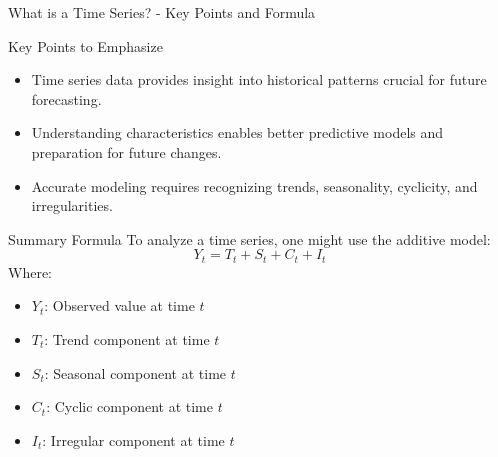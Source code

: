 \documentclass[aspectratio=169]{beamer}
\begin{document}
\begin{frame}[fragile]{What is a Time Series? - Key Points and Formula}
    \begin{block}{Key Points to Emphasize}
        \begin{itemize}
            \item Time series data provides insight into historical patterns crucial for future forecasting.
            \item Understanding characteristics enables better predictive models and preparation for future changes.
            \item Accurate modeling requires recognizing trends, seasonality, cyclicity, and irregularities.
        \end{itemize}
    \end{block}

    \begin{block}{Summary Formula}
        To analyze a time series, one might use the additive model:
        \begin{equation}
            Y_t = T_t + S_t + C_t + I_t 
        \end{equation}
        Where:
        \begin{itemize}
            \item $Y_t$: Observed value at time $t$
            \item $T_t$: Trend component at time $t$
            \item $S_t$: Seasonal component at time $t$
            \item $C_t$: Cyclic component at time $t$
            \item $I_t$: Irregular component at time $t$
        \end{itemize}
    \end{block}
\end{frame}
\end{document}
